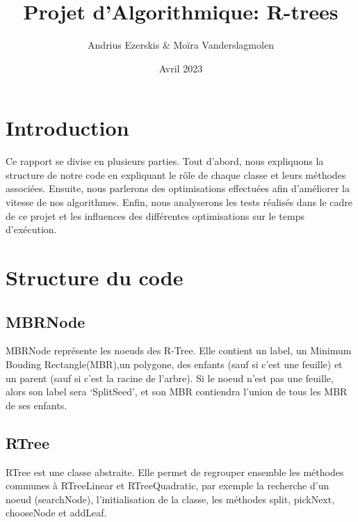 \documentclass[utf8]{article}
\begin{document}
\begin{titlepage}


    \author{Andrius Ezerskis \& Moïra Vanderslagmolen}
    \title{Projet d'Algorithmique: R-trees}
    \date{Avril 2023}
    \maketitle
\end{titlepage}
\tableofcontents
\newpage
\begin{large}


    \section{Introduction}
    \indent
    \par
    Ce rapport se divise en plusieurs parties. Tout d'abord, nous expliquons la
    structure de notre code en expliquant le rôle de chaque classe et leurs
    méthodes associées. Ensuite, nous parlerons des optimisations effectuées afin
    d'améliorer la vitesse de nos algorithmes. Enfin, nous analyserons les tests
    réalisés dans le cadre de ce projet et les influences des différentes
    optimisations sur le temps d'exécution.
    \par
    \section{Structure du code}

    \par
    \subsection{MBRNode}
    \indent
    \par
    MBRNode représente les noeuds des R-Tree. Elle contient un label, un Minimum Bouding Rectangle(MBR),un polygone,
    des enfants (sauf si c'est une feuille) et un parent (sauf si c'est la racine de
    l'arbre). Si le noeud n'est pas une feuille, alors son label sera `SplitSeed',
    et son MBR contiendra l'union de tous les MBR de ses enfants.
    \par

    \subsection{RTree}\label{RTree}
    \indent
    \par
    RTree est une classe abstraite. Elle permet de regrouper ensemble les méthodes
    communes à RTreeLinear et RTreeQuadratic, par exemple la recherche d'un noeud
    (searchNode), l'initialisation de la classe, les méthodes split, pickNext,
    chooseNode et addLeaf.
    \par


\end{large}
\end{document}
